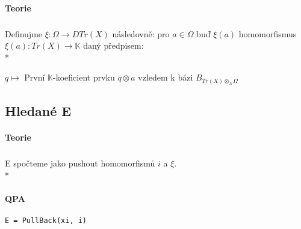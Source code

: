 \documentclass[7pt]{article}
\begin{document}
      \paragraph{Teorie}
         \subparagraph{} Definujme $\xi:\Omega\rightarrow DTr(X)$ následovně: pro  $a\in\Omega$ buď
         $\xi(a)$ homomorfismus $\xi(a):Tr(X)\rightarrow \mathbb{K}$ daný předpisem:  \\*
         \centerline{ 
           $q\mapsto$ První $\mathbb{K}$-koeficient prvku $q\otimes a$ vzledem k bázi  $B_{Tr(X)\otimes_\Lambda\Omega}$
         }         
 
    \subsection{Hledané E}
      \paragraph{Teorie}
         \subparagraph{} E spočteme jako pushout homomorfismů $i$ a $\xi$. \\*
        \centerline{  }

      \paragraph{QPA}   
        \begin{verbatim}E = PullBack(xi, i)\end{verbatim}
      
\end{document}
